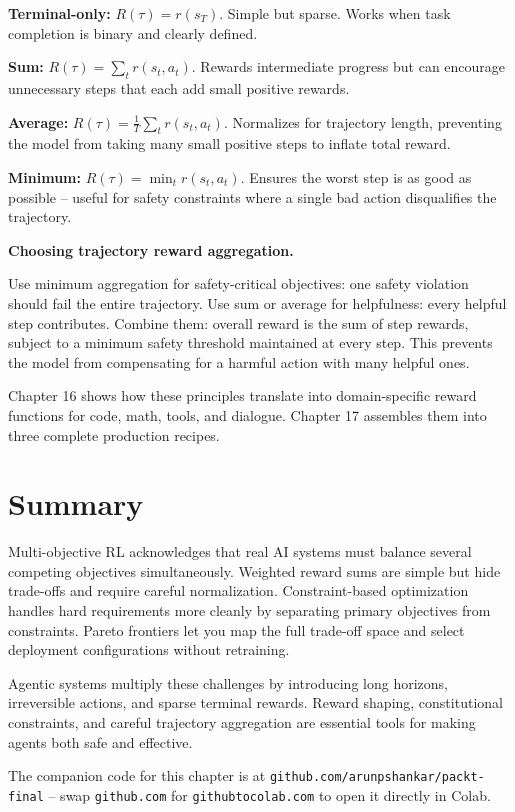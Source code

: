 \begin{chapterenv}
\textbf{Terminal-only:} $R(\tau) = r(s_T)$. Simple but sparse. Works when task completion is binary and clearly defined.

\textbf{Sum:} $R(\tau) = \sum_t r(s_t, a_t)$. Rewards intermediate progress but can encourage unnecessary steps that each add small positive rewards.

\textbf{Average:} $R(\tau) = \frac{1}{T} \sum_t r(s_t, a_t)$. Normalizes for trajectory length, preventing the model from taking many small positive steps to inflate total reward.

\textbf{Minimum:} $R(\tau) = \min_t r(s_t, a_t)$. Ensures the worst step is as good as possible -- useful for safety constraints where a single bad action disqualifies the trajectory.

\begin{tipbox}
\textbf{Choosing trajectory reward aggregation.}

Use minimum aggregation for safety-critical objectives: one safety violation should fail the entire trajectory. Use sum or average for helpfulness: every helpful step contributes. Combine them: overall reward is the sum of step rewards, subject to a minimum safety threshold maintained at every step. This prevents the model from compensating for a harmful action with many helpful ones.

Chapter 16 shows how these principles translate into domain-specific reward functions for code, math, tools, and dialogue. Chapter 17 assembles them into three complete production recipes.
\end{tipbox}

\section{Summary}

Multi-objective RL acknowledges that real AI systems must balance several competing objectives simultaneously. Weighted reward sums are simple but hide trade-offs and require careful normalization. Constraint-based optimization handles hard requirements more cleanly by separating primary objectives from constraints. Pareto frontiers let you map the full trade-off space and select deployment configurations without retraining.

Agentic systems multiply these challenges by introducing long horizons, irreversible actions, and sparse terminal rewards. Reward shaping, constitutional constraints, and careful trajectory aggregation are essential tools for making agents both safe and effective.


The companion code for this chapter is at \texttt{github.com/arunpshankar/packt-final} -- swap \texttt{github.com} for \texttt{githubtocolab.com} to open it directly in Colab.

\end{chapterenv}
